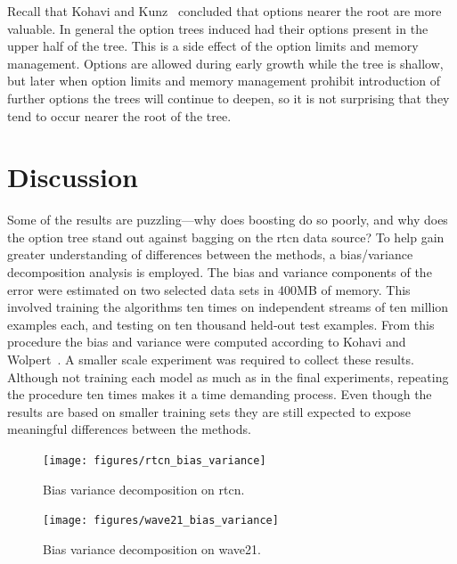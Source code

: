 Recall that Kohavi and Kunz~\cite{kohaviot} concluded that options nearer the root are more valuable. In general the option trees induced had their options present in the upper half of the tree. This is a side effect of the option limits and memory management. Options are allowed during early growth while the tree is shallow, but later when option limits and memory management prohibit introduction of further options the trees will continue to deepen, so it is not surprising that they tend to occur nearer the root of the tree.

\section{Discussion}
\label{sec:boostdiscuss}

Some of the results are puzzling---why does boosting do so poorly, and why does the option tree stand out against bagging on the {\sc rtcn} data source? To help gain greater understanding of differences between the methods, a bias/variance decomposition analysis is employed. The bias and variance components of the error were estimated on two selected data sets in 400MB of memory. This involved training the algorithms ten times on independent streams of ten million examples each, and testing on ten thousand held-out test examples. From this procedure the bias and variance were computed according to Kohavi and Wolpert~\cite{bvdecomp}. A smaller scale experiment was required to collect these results. Although not training each model as much as in the final experiments, repeating the procedure ten times makes it a time demanding process. Even though the results are based on smaller training sets they are still expected to expose meaningful differences between the methods.

\begin{figure}
\texttt{[image: figures/rtcn\_bias\_variance]}
\caption{Bias variance decomposition on {\sc rtcn}.}
\label{fig:rtcn_dvdecomp}
\end{figure}

\begin{figure}
\texttt{[image: figures/wave21\_bias\_variance]}
\caption{Bias variance decomposition on {\sc wave21}.}
\label{fig:wave21_dvdecomp}
\end{figure}

